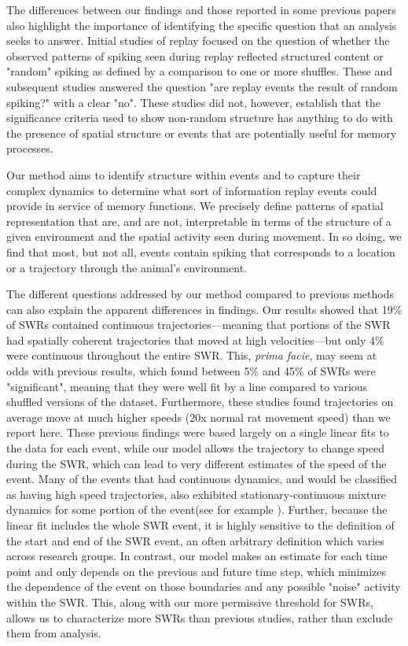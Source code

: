 \documentclass[9pt,lineno]{elife}
\begin{document}
The differences between our findings and those reported in some previous papers also highlight the importance of identifying the specific question that an analysis seeks to answer. Initial studies of replay \citep{LeeMemorySequentialExperience2002, FosterReversereplaybehavioural2006, DavidsonHippocampalReplayExtended2009, KarlssonAwakereplayremote2009} focused on the question of whether the observed patterns of spiking seen during replay reflected structured content or "random" spiking as defined by a comparison to one or more shuffles. These and subsequent studies answered the question "are replay events the result of random spiking?" with a clear "no". These studies did not, however, establish that the significance criteria used to show non-random structure has anything to do with the presence of spatial structure or events that are potentially useful for memory processes.

Our method aims to identify structure within events and to capture their complex dynamics to determine what sort of information replay events could provide in service of memory functions. We precisely define patterns of spatial representation that are, and are not, interpretable in terms of the structure of a given environment and the spatial activity seen during movement. In so doing, we find that most, but not all, events contain spiking that corresponds to a location or a trajectory through the animal's environment. 

The different questions addressed by our method compared to previous methods can also explain the apparent differences in findings. Our results showed that 19\% of SWRs contained continuous trajectories---meaning that portions of the SWR had spatially coherent trajectories that moved at high velocities---but only 4\% were continuous throughout the entire SWR. This, \textit{prima facie}, may seem at odds with previous results, which found between 5\% and 45\% of SWRs were "significant", meaning that they were well fit by a line compared to various shuffled versions of the dataset. Furthermore, these studies found trajectories on average move at much higher speeds (20x normal rat movement speed) than we report here. These previous findings were based largely on a single linear fits to the data for each event, while our model allows the trajectory to change speed during the SWR, which can lead to very different estimates of the speed of the event. Many of the events that had continuous dynamics, and would be classified as having high speed trajectories, also exhibited stationary-continuous mixture dynamics for some portion of the event(see for example ). Further, because the linear fit includes the whole SWR event, it is highly sensitive to the definition of the start and end of the SWR event, an often arbitrary definition which varies across research groups. In contrast, our model makes an estimate for each time point and only depends on the previous and future time step, which minimizes the dependence of the event on those boundaries and any possible "noise" activity within the SWR. This, along with our more permissive threshold for SWRs, allows us to characterize more SWRs than previous studies, rather than exclude them from analysis.
\end{document}
